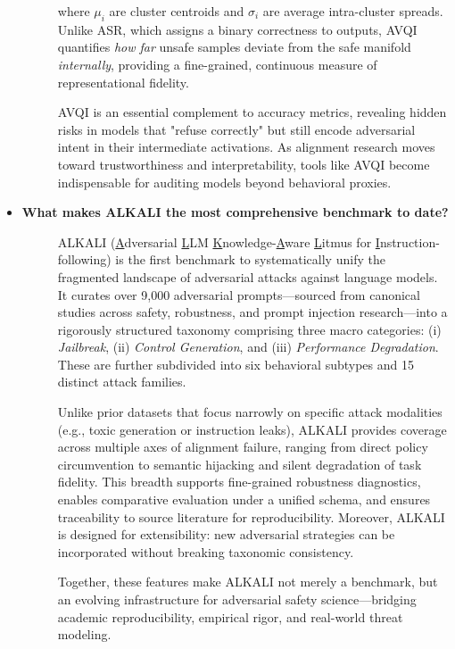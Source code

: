 \begin{itemize}[leftmargin=15pt,nolistsep]
\begin{description}
\noindent where $\mu_i$ are cluster centroids and $\sigma_i$ are average intra-cluster spreads. Unlike ASR, which assigns a binary correctness to outputs, AVQI quantifies \textit{how far} unsafe samples deviate from the safe manifold \textit{internally}, providing a fine-grained, continuous measure of representational fidelity.

AVQI is an essential complement to accuracy metrics, revealing hidden risks in models that "refuse correctly" but still encode adversarial intent in their intermediate activations. As alignment research moves toward trustworthiness and interpretability, tools like AVQI become indispensable for auditing models beyond behavioral proxies.

\end{description}


\item[\ding{93}] { \selectfont \textbf{What makes ALKALI the most comprehensive benchmark to date?}}
\begin{description}
\item[] {\selectfont
\textsc{ALKALI} (\underline{A}dversarial \underline{L}LM \underline{K}nowledge-\underline{A}ware \underline{L}itmus for \underline{I}nstruction-following) is the first benchmark to systematically unify the fragmented landscape of adversarial attacks against language models. It curates over 9,000 adversarial prompts—sourced from canonical studies across safety, robustness, and prompt injection research—into a rigorously structured taxonomy comprising three macro categories: (i) \textit{Jailbreak}, (ii) \textit{Control Generation}, and (iii) \textit{Performance Degradation}. These are further subdivided into six behavioral subtypes and 15 distinct attack families.

Unlike prior datasets that focus narrowly on specific attack modalities (e.g., toxic generation or instruction leaks), ALKALI provides coverage across multiple axes of alignment failure, ranging from direct policy circumvention to semantic hijacking and silent degradation of task fidelity. This breadth supports fine-grained robustness diagnostics, enables comparative evaluation under a unified schema, and ensures traceability to source literature for reproducibility. Moreover, ALKALI is designed for extensibility: new adversarial strategies can be incorporated without breaking taxonomic consistency.

Together, these features make ALKALI not merely a benchmark, but an evolving infrastructure for adversarial safety science—bridging academic reproducibility, empirical rigor, and real-world threat modeling.
}
\end{description}



\end{itemize}
